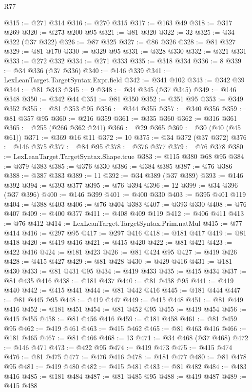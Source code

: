 \begin{lexlean}{R77}
\begin{coremodule}
@315 := @271 @314
@316 := @270 @315
@317 := @163 @49
@318 := @317 @269
@320 := @273 @200 @95
@321 := @81 @320
@322 := 32
@325 := @34 @322 (@37 @322)
@326 := @87 @325
@327 := @86 @326
@328 := @81 @327
@329 := @81 @170
@330 := @329 @95
@331 := @328 @330
@332 := @321 @331
@333 := @272 @332
@334 := @271 @333
@335 := @318 @334
@336 := 8
@339 := @34 @336 (@37 @336)
@340 := @146 @339
@341 := LexLeanTarget.TargetSyntax.Expr.field
@342 := @341 @102
@343 := @342 @39
@344 := @81 @343
@345 := 9
@348 := @34 @345 (@37 @345)
@349 := @146 @348
@350 := @342 @44
@351 := @81 @350
@352 := @351 @95
@353 := @349 @352
@355 := @81 @353 @95
@356 := @344 @355
@357 := @340 @356
@359 := @81 @357 @95
@360 := @216 @359
@361 := @335 @360
@362 := @316 @361
@365 := @255 (@266 @362 @241)
@366 := @29 @365
@369 := @30 (@40 (@45 @61))
@371 := @369 @16 @11
@372 := 10
@375 := @34 @372 (@37 @372)
@376 := @146 @375
@377 := @84 @95
@378 := @376 @377
@379 := @76 @378
@380 := LexLeanTarget.TargetSyntax.Shape.true
@383 := @115 @380 @68 @95
@384 := @379 @383
@385 := @376 @330
@386 := @384 @385
@387 := @76 @386
@388 := @387 @383
@389 := 11
@392 := @34 @389 (@37 @389)
@393 := @146 @392
@394 := @393 @377
@395 := @76 @394
@396 := 12
@399 := @34 @396 (@37 @396)
@400 := @146 @399
@401 := @400 @330
@403 := @395 @401 @119
@404 := @388 @403
@406 := @76 @404 @383
@407 := @393 @330
@408 := @76 @407
@409 := @400 @377
@411 := @408 @409 @119
@412 := @406 @411
@413 := @76 @412
@414 := LexLeanTarget.TargetSyntax.Prim.natMul
@415 := @77 @414
@416 := @297 @95
@417 := @297 @416
@418 := @181 @417
@419 := @81 @418
@420 := @419 @416
@421 := @415 @420
@422 := @81 @421
@423 := @422 @416
@424 := @181 @423
@426 := @81 @424 @95
@427 := @419 @426
@428 := @415 @427
@429 := @81 @428
@430 := @429 @416
@431 := @181 @430
@433 := @81 @431 @95
@434 := @419 @433
@435 := @415 @434
@437 := @81 @435 @416
@438 := @181 @437
@440 := @81 @438 @95
@441 := @419 @440
@442 := @415 @441
@444 := @81 @442 @416
@445 := @181 @444
@447 := @81 @445 @95
@448 := @419 @447
@449 := @415 @448
@451 := @81 @449 @416
@452 := @181 @451
@454 := @81 @452 @95
@455 := @419 @454
@456 := @415 @455
@458 := @81 @456 @416
@459 := @181 @458
@461 := @81 @459 @95
@462 := @419 @461
@463 := @415 @462
@465 := @81 @463 @416
@466 := @181 @465
@467 := @81 @466
@468 := 13
@471 := @34 @468 (@37 @468)
@472 := @146 @471
@473 := @422 @95
@474 := @419 @473
@475 := @415 @474
@476 := @81 @475
@477 := @476 @416
@478 := @181 @477
@480 := @81 @478 @95
@481 := @419 @480
@482 := @415 @481
@483 := @81 @482
@484 := @483 @416
@485 := @181 @484
@487 := @81 @485 @95
@488 := @419 @487
@489 := @415 @488

\end{coremodule}
\end{lexlean}
